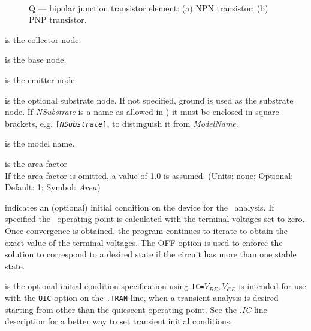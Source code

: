 \begin{figure}[h]
\centering
\ 
\caption[Q --- bipolar junction transistor element]{Q --- bipolar junction
transistor element: (a) NPN transistor; (b) PNP transistor.}
\end{figure}


\begin{widelist}
\item[{\it NCollector}] is the collector node.
\item[{\it NBase}] is the base node.
\item[{\it NEmitter}] is the emitter node.
\item[{\it NSubstrate}] is the optional substrate node.
If not specified, ground is used as the substrate node.
If {\it NSubstrate} is a name {as allowed in \pspice )} it must
be enclosed in square brackets, e.g. {\tt [{\it NSubstrate}]}, to
distinguish it from {\it ModelName}.
\item[{\it ModelName}] is  the  model  name.
\item[{\it Area}]  is  the  area  factor\\
If the area  factor  is  omitted,  a  value of 1.0 is assumed.
(Units: none; Optional; Default: 1; Symbol: $Area$)
\item[{\tt OFF}] indicates an (optional)
initial condition on the device for the \dc\ analysis.
If specified the \dc\ operating point is calculated with the terminal voltages
set to zero.  Once convergence is obtained, the
program continues to iterate to obtain the exact  value of
the  terminal  voltages.  The OFF option is used to enforce the solution
to  correspond  to  a  desired  state if the circuit has more than one stable
state.
\item[{\tt IC}] is the
optional initial condition specification using  {\tt IC=}$V_{BE},V_{CE}$
is  intended  for use with the {\tt UIC} option on the {\tt .TRAN} line,
when a transient analysis is  desired  starting  from  other
than  the  quiescent  operating  point.   See  the  {\it .IC} line
description for a better way to set transient initial conditions.
\end{widelist}


